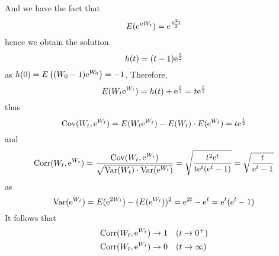 \documentclass{homework}
\begin{document}
    And we have the fact that
    \[E(\mathrm e^{uW_t})=\mathrm e^{\frac{u^2t}2}\]
    hence we obtain the solution
    \[h(t)=(t-1)\mathrm e^{\frac{t}{2}}\]
    as $h(0)=E\left((W_0-1)\mathrm e^{W_0}\right)=-1$.
    Therefore,
    \[E(W_t\mathrm e^{W_t})=h(t)+\mathrm e^{\frac{t}{2}}=t\mathrm e^{\frac{t}{2}}\]
    thus
    \def\cov{\mathrm{Cov}}
    \def\var{\mathrm{Var}}
    \def\corr{\mathrm{Corr}}
    \[\cov(W_t,\e^{W_t})=E(W_t\e^{W_t})-E(W_t)\cdot E(\e^{W_t})
    =t\e^{\frac{t}{2}}\]
    and
    \[\corr(W_t,\e^{W_t})=\frac{\cov(W_t,\e^{W_t})}%
    {\sqrt{\var(W_t)\cdot\var(\e^{W_t})}}
    =\sqrt{\frac{t^2\e^t}{t\e^t(\e^t-1)}}
    =\sqrt{\frac{t}{\e^t-1}}\]
    as
    \[\var(\e^{W_t})=E(\e^{2W_t})-(E(\e^{W_t}))^2
    =\e^{2t}-\e^t=
    \e^t(\e^t-1)\]
    It follows that
    \[\begin{aligned}
        \corr(W_t,\e^{W_t})&\to 1\quad(t\to 0^+)\\
        \corr(W_t,\e^{W_t})&\to 0\quad(t\to \infty)
    \end{aligned}\]
\end{document}
